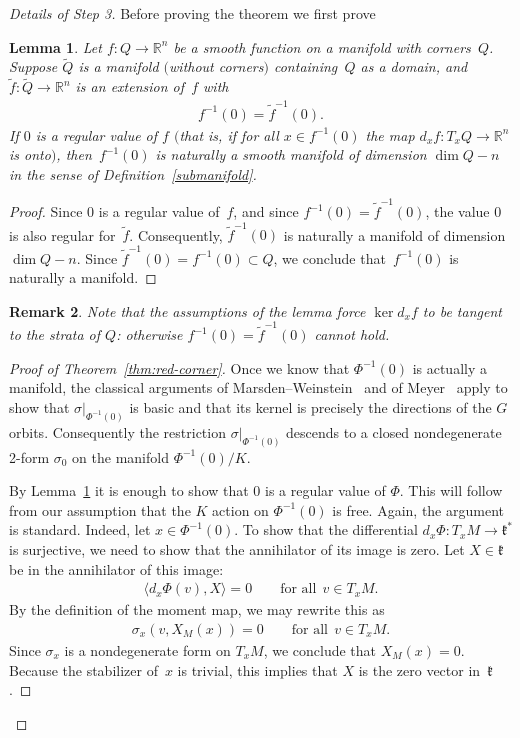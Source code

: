 \documentclass[pdftex]{sigma}
\numberwithin{equation}{section}
\newtheorem{Lemma}{Lemma}[section]
\newtheorem{Remark}[Lemma]{Remark}
\begin{document}
\begin{proof}[Details of Step 3]
Before proving the theorem we f\/irst prove
\begin{Lemma}\label{lem2:28}
Let $f\colon Q\to {\mathbb R}^n$ be a smooth function on a manifold with corners~$Q$.
Suppose $\tilde{Q}$ is a manifold $($without corners$)$ containing~$Q$ as a domain,
and $\tilde{f}\colon \tilde{Q}\to {\mathbb R}^n$ is an extension of~$f$ with
\begin{gather*}
f^{-1} (0) = \tilde{f}^{-1} (0).
\end{gather*}
If $0$ is a regular value of $f$ $($that is, if for all $x\in f^{-1} (0)$
the map $d_x f\colon T_xQ\to {\mathbb R}^n$ is onto$)$, then~$f^{-1} (0)$ is naturally
a smooth manifold of dimension $\dim Q-n$
in the sense of Definition~{\rm \ref{submanifold}}.
\end{Lemma}

\begin{proof}
Since $0$ is a regular value of~$f$, and since $f^{-1} (0) = \tilde{f}^{-1} (0)$,
the value $0$ is also regular for~$\tilde{f}$.  Consequently,
$\tilde{f}^{-1} (0)$ is naturally a manifold of dimension $\dim Q - n$.
Since $\tilde{f}^{-1} (0) = f^{-1} (0)\subset Q$, we conclude
that~$f^{-1} (0)$ is naturally a manifold.
\end{proof}

\begin{Remark}
  Note that the assumptions of the lemma force $\ker d_x f$ to be
  tangent to the strata of $Q$: otherwise $f^{-1} (0) = \tilde{f}^{-1}
  (0)$ cannot hold.
\end{Remark}

\begin{proof}[Proof of Theorem~\ref{thm:red-corner}]
  Once we know that $\Phi^{-1} (0)$ is actually a manifold, the
  classical arguments of Marsden--Weinstein~\cite{MW} and of Meyer~\cite{Meyer} apply to show that $\sigma|_{\Phi^{-1} (0)}$ is basic and
  that its kernel is precisely the directions of the $G$ orbits.
  Consequently the restriction $\sigma|_{\Phi^{-1} (0)}$ descends to a
  closed nondegenerate 2-form $\sigma_0$ on the manifold $\Phi^{-1}
  (0)/K$.

  By Lemma~\ref{lem2:28} it is enough to show that 0 is a regular
  value of $\Phi$. This will follow from our assumption that the $K$
  action on $\Phi^{-1} (0)$ is free. Again, the argument is
  standard. Indeed, let $x \in \Phi^{-1} (0)$.  To show that the
  dif\/ferential $d_x \Phi\colon  T_xM \to {\mathfrak k}^*$ is surjective, we need to
  show that the annihilator of its image is zero.  Let $X \in {\mathfrak k}$ be
  in the annihilator of this image:
\begin{gather*}
\langle d_x \Phi (v), X\rangle = 0
      \qquad  \textrm{for all} \ \ v\in T_x M  .
\end{gather*}
By the def\/inition of the moment map, we may rewrite this as
\begin{gather*}
     \sigma_x(v,X_M(x)) = 0 \qquad \text{for all} \ \ v \in T_xM .
\end{gather*}
Since $\sigma_x$ is a nondegenerate form on $T_xM$,
we conclude that $X_M(x) = 0$.
Because the stabilizer of~$x$ is trivial, this implies
that $X$ is the zero vector in~${\mathfrak k}$.
\end{proof}


\end{proof}
\end{document}
